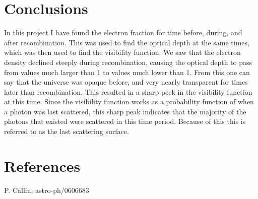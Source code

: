 \documentclass{aa}   %
\begin{document}
  

\section{Conclusions} \label{sec:conclusions}
In this project I have found the electron fraction for time before, during, and after recombination.
This was used to find the optical depth at the same times, which was then used to find the visibility function.
We saw that the electron density declined steeply during recombination, causing the optical depth to pass from values much larger than 1 to values much lower than 1. 
From this one can say that the universe was opaque before, and very nearly transparent for times later than recombination.
This resulted in a sharp peek in the visibility function at this time. Since the visibility function works as a probability function of when a photon was last scattered, this sharp peak indicates that the majority of the photons that existed were scattered in this time period. Because of this this is referred to as the last scattering surface. 
\section{References}
\begin{enumerate}[label= {[}\arabic*{]} ]
 \item P. Callin, astro-ph/0606683
\end{enumerate}



%
\end{document}
